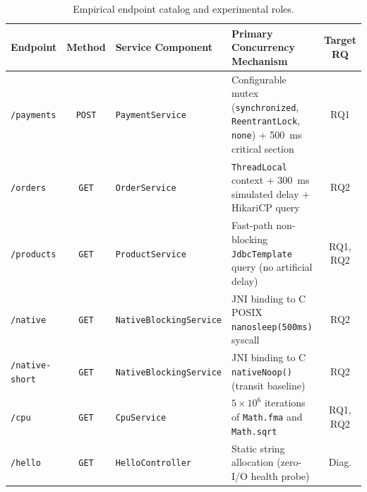 \begin{table}[htbp]
  \centering
  \small
  \caption{Empirical endpoint catalog and experimental roles.}
  \label{tab:endpoint-catalog}
  \begin{tabularx}{\textwidth}{@{}>{\raggedright\arraybackslash}p{}c>{\raggedright\arraybackslash}p{}>{\raggedright\arraybackslash}Xc@{}}
    \toprule
    \textbf{Endpoint} & \textbf{Method} & \textbf{Service Component} & \textbf{Primary Concurrency Mechanism} & \textbf{Target RQ} \\
    \midrule
    \texttt{/payments} & \texttt{POST} & \texttt{PaymentService} & Configurable mutex (\texttt{synchronized}, \texttt{ReentrantLock}, \texttt{none}) + 500~ms critical section & RQ1 \\
    \addlinespace
    \texttt{/orders} & \texttt{GET} & \texttt{OrderService} & \texttt{ThreadLocal} context + 300~ms simulated delay + HikariCP query & RQ2 \\
    \addlinespace
    \texttt{/products} & \texttt{GET} & \texttt{ProductService} & Fast-path non-blocking \texttt{JdbcTemplate} query (no artificial delay) & RQ1, RQ2 \\
    \addlinespace
    \texttt{/native} & \texttt{GET} & \texttt{NativeBlocking}\allowbreak\texttt{Service} & JNI binding to C POSIX \texttt{nanosleep(500ms)} syscall & RQ2 \\
    \addlinespace
    \texttt{/native-short} & \texttt{GET} & \texttt{NativeBlocking}\allowbreak\texttt{Service} & JNI binding to C \texttt{nativeNoop()} (transit baseline) & RQ2 \\
    \addlinespace
    \texttt{/cpu} & \texttt{GET} & \texttt{CpuService} & $5 \times 10^6$ iterations of \texttt{Math.fma} and \texttt{Math.sqrt} & RQ1, RQ2 \\
    \addlinespace
    \texttt{/hello} & \texttt{GET} & \texttt{HelloController} & Static string allocation (zero-I/O health probe) & Diag. \\
    \bottomrule
  \end{tabularx}
\end{table}

